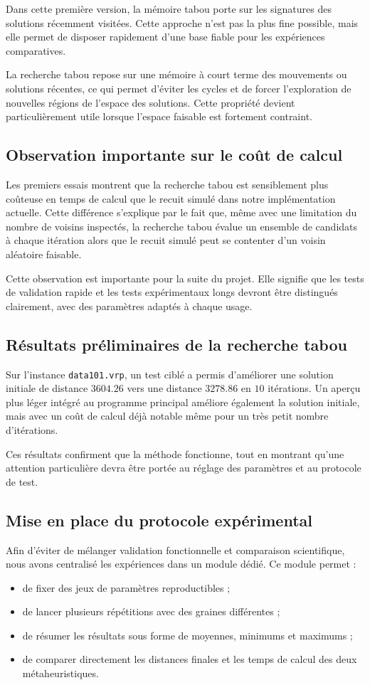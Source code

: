 \documentclass[11pt,a4paper]{article}
\begin{document}
Dans cette première version, la mémoire tabou porte sur les signatures des solutions récemment visitées. Cette approche n'est pas la plus fine possible, mais elle permet de disposer rapidement d'une base fiable pour les expériences comparatives.

La recherche tabou repose sur une mémoire à court terme des mouvements ou solutions récentes, ce qui permet d'éviter les cycles et de forcer l'exploration de nouvelles régions de l'espace des solutions. Cette propriété devient particulièrement utile lorsque l'espace faisable est fortement contraint.

\subsection{Observation importante sur le coût de calcul}
Les premiers essais montrent que la recherche tabou est sensiblement plus coûteuse en temps de calcul que le recuit simulé dans notre implémentation actuelle. Cette différence s'explique par le fait que, même avec une limitation du nombre de voisins inspectés, la recherche tabou évalue un ensemble de candidats à chaque itération alors que le recuit simulé peut se contenter d'un voisin aléatoire faisable.

Cette observation est importante pour la suite du projet. Elle signifie que les tests de validation rapide et les tests expérimentaux longs devront être distingués clairement, avec des paramètres adaptés à chaque usage.

\subsection{Résultats préliminaires de la recherche tabou}
Sur l'instance \texttt{data101.vrp}, un test ciblé a permis d'améliorer une solution initiale de distance \(3604.26\) vers une distance \(3278.86\) en \(10\) itérations. Un aperçu plus léger intégré au programme principal améliore également la solution initiale, mais avec un coût de calcul déjà notable même pour un très petit nombre d'itérations.

Ces résultats confirment que la méthode fonctionne, tout en montrant qu'une attention particulière devra être portée au réglage des paramètres et au protocole de test.

\subsection{Mise en place du protocole expérimental}
Afin d'éviter de mélanger validation fonctionnelle et comparaison scientifique, nous avons centralisé les expériences dans un module dédié. Ce module permet :
\begin{itemize}
    \item de fixer des jeux de paramètres reproductibles ;
    \item de lancer plusieurs répétitions avec des graines différentes ;
    \item de résumer les résultats sous forme de moyennes, minimums et maximums ;
    \item de comparer directement les distances finales et les temps de calcul des deux métaheuristiques.
\end{itemize}
\end{document}
